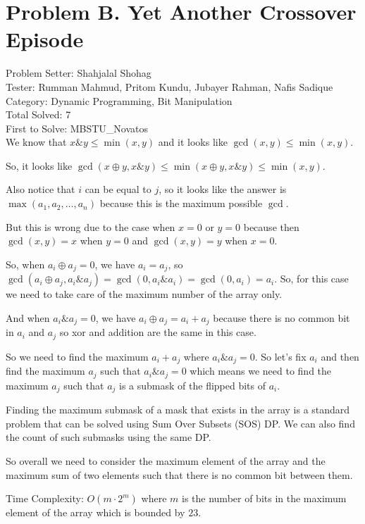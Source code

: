 \section*{Problem B. Yet Another Crossover Episode}

Problem Setter: Shahjalal Shohag \\
Tester: Rumman Mahmud, Pritom Kundu, Jubayer Rahman, Nafis Sadique \\
Category: Dynamic Programming, Bit Manipulation \\
Total Solved: 7 \\
First to Solve: MBSTU\_Novatos \\

We know that $x \& y \le \min(x, y)$ and it looks like $\gcd(x, y) \le \min(x, y)$.

So, it looks like $\gcd(x \oplus y, x \& y) \le \min(x \oplus y, x \& y) \le \min(x, y)$.

Also notice that $i$ can be equal to $j$, so it looks like the answer is $\max({a_1, a_2, \ldots, a_n})$ because this is the maximum possible $\gcd$.

But this is wrong due to the case when $x = 0$ or $y = 0$ because then $\gcd(x, y) = x$ when $y = 0$ and $\gcd(x, y) = y$ when $x = 0$.

So, when $a_i \oplus a_j = 0$, we have $a_i = a_j$, so $\gcd(a_i \oplus a_j, a_i \& a_j) = \gcd(0, a_i \& a_i) = \gcd(0, a_i) = a_i$.
So, for this case we need to take care of the maximum number of the array only.

And when $a_i \& a_j = 0$, we have $a_i \oplus a_j = a_i + a_j$ because there is no common bit in $a_i$ and $a_j$
so xor and addition are the same in this case.

So we need to find the maximum $a_i + a_j$ where $a_i \& a_j = 0$. So let's fix $a_i$
and then find the maximum $a_j$ such that $a_i \& a_j = 0$ which means we 
need to find the maximum $a_j$ such that $a_j$ is a submask of the flipped bits of $a_i$.

Finding the maximum submask of a mask that exists in the array is a standard problem that can be solved
using Sum Over Subsets (SOS) DP. We can also find the count of such submasks using the same DP.

So overall we need to consider the maximum element of the array and the maximum sum of two elements such that there is no common bit between them.

Time Complexity: $O(m \cdot 2^m)$ where $m$ is the number of bits in the maximum element of the array which is bounded by $23$.
